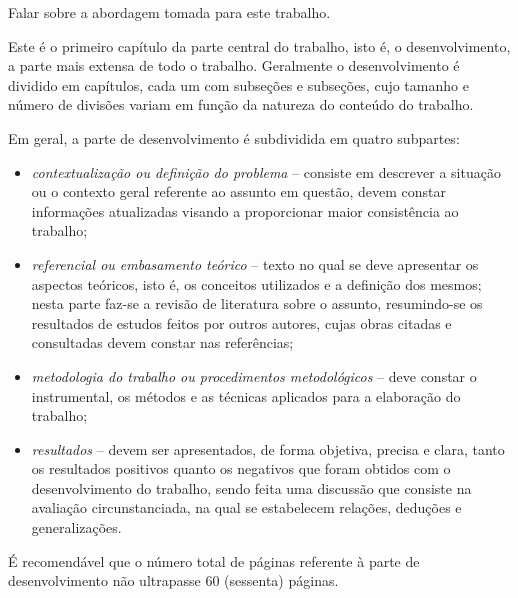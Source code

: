 \begin{guide}
	Falar sobre a abordagem tomada para este trabalho.
\end{guide}

Este é o primeiro capítulo da parte central do trabalho, isto é, o desenvolvimento, a parte mais extensa de todo o trabalho. Geralmente o desenvolvimento é dividido em capítulos, cada um com subseções e subseções, cujo tamanho e número de divisões variam em função da natureza do conteúdo do trabalho.

Em geral, a parte de desenvolvimento é subdividida em quatro subpartes:

\begin{itemize}
   \item \textit{contextualização ou definição do problema} -- consiste em
   descrever a situação ou o contexto geral referente ao assunto em questão,
   devem constar informações atualizadas visando a proporcionar maior
   consistência ao trabalho;
   \item \textit{referencial ou embasamento teórico} -- texto no qual se deve
   apresentar os aspectos teóricos, isto é, os conceitos utilizados e a
   definição dos mesmos; nesta parte faz-se a revisão de literatura sobre o
   assunto, resumindo-se os resultados de estudos feitos por outros autores,
   cujas obras citadas e consultadas devem constar nas referências;
   \item \textit{metodologia do trabalho ou procedimentos metodológicos} -- deve
   constar o instrumental, os métodos e as técnicas aplicados para a elaboração
   do trabalho;
   \item \textit{resultados} -- devem ser apresentados, de forma objetiva,
   precisa e clara, tanto os resultados positivos quanto os negativos que foram
   obtidos com o desenvolvimento do trabalho, sendo feita uma discussão que
   consiste na avaliação circunstanciada, na qual se estabelecem relações,
   deduções e generalizações.
\end{itemize}

É recomendável que o número total de páginas referente à parte de
 desenvolvimento não ultrapasse 60 (sessenta) páginas.